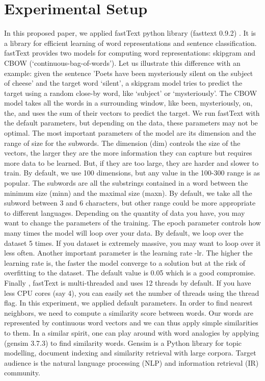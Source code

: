 \documentclass[conference]{IEEEtran}
\begin{document}
\section {Experimental Setup}\label{Sec:experimentalsetup}
In this proposed paper, we applied fastText python library (fasttext 0.9.2) \cite{b12}. It is a library for efficient learning of word representations and sentence classification. fastText provides two models for computing word representations: skipgram and CBOW (`continuous-bag-of-words'). Let us illustrate this difference with an example: given the sentence 'Poets have been mysteriously silent on the subject of cheese' and the target word `silent', a skipgram model tries to predict the target using a random close-by word, like `subject' or `mysteriously'. The CBOW model takes all the words in a surrounding window, like {been, mysteriously, on, the}, and uses the sum of their vectors to predict the target. We run fastText with the default parameters, but depending on the data, these parameters may not be optimal. The most important parameters of the model are its dimension and the range of size for the subwords. The dimension (dim) controls the size of the vectors, the larger they are the more information they can capture but requires more data to be learned. But, if they are too large, they are harder and slower to train. By default, we use 100 dimensions, but any value in the 100-300 range is as popular. The subwords are all the substrings contained in a word between the minimum size (minn) and the maximal size (maxn). By default, we take all the subword between 3 and 6 characters, but other range could be more appropriate to different languages. Depending on the quantity of data you have, you may want to change the parameters of the training. The epoch parameter controls how many times the model will loop over your data. By default, we loop over the dataset 5 times. If you dataset is extremely massive, you may want to loop over it less often. Another important parameter is the learning rate -lr. The higher the learning rate is, the faster the model converge to a solution but at the risk of overfitting to the dataset. The default value is 0.05 which is a good compromise. Finally , fastText is multi-threaded and uses 12 threads by default. If you have less CPU cores (say 4), you can easily set the number of threads using the thread flag. In this experiment, we applied default parameters. In order to find nearest neighbors, we need to compute a similarity score between words. Our words are represented by continuous word vectors and we can thus apply simple similarities to them. In a similar spirit, one can play around with word analogies by applying (gensim 3.7.3) \cite{b13} to find similarity words. Gensim is a Python library for topic modelling, document indexing and similarity retrieval with large corpora. Target audience is the natural language processing (NLP) and information retrieval (IR) community.
\end{document}

